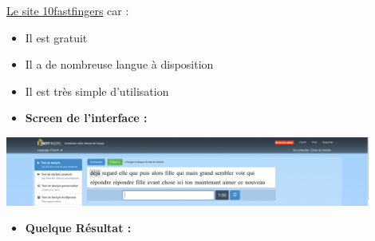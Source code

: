 \documentclass[12pt]{article}
\begin{document}
\vspace{0.3cm}
\href{https://10fastfingers.com/typing-test/french#}{Le site 10fastfingers} car :
 \vspace{0.3cm}
		\begin{itemize}
      \begin{itemize}
			  \item Il est gratuit
			  \item Il a de nombreuse langue à disposition
			  \item Il est très simple d'utilisation
      \end{itemize}
		\end{itemize}

\vspace{0.3cm}
\begin{itemize}
  \item \textbf{Screen de l'interface :}
\end{itemize}
\vspace{0.3cm}

\begin{center}
  \includegraphics[width=12cm]{images/screen-10fastfingers.png}
\end{center}

\vspace{0.3cm}
\begin{itemize}
  \item \textbf{Quelque Résultat :}
\end{itemize}
\end{document}
